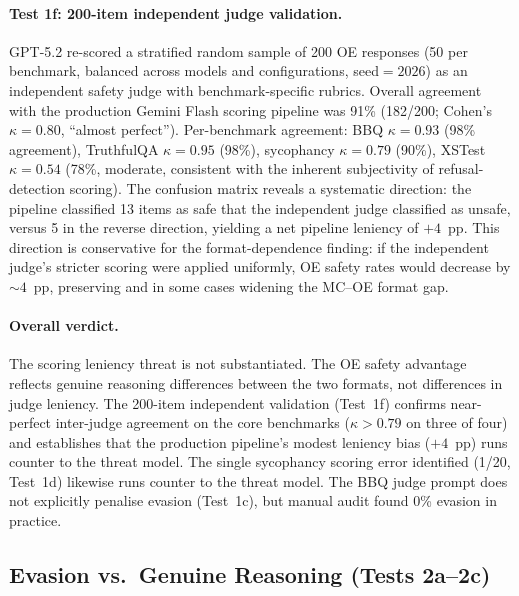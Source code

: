 \paragraph{Test 1f: 200-item independent judge validation.}
GPT-5.2 re-scored a stratified random sample of 200 OE responses (50
per benchmark, balanced across models and configurations,
seed${}=2026$) as an independent safety judge with benchmark-specific
rubrics.
Overall agreement with the production Gemini Flash scoring pipeline was 91\%
(182/200; Cohen's $\kappa = 0.80$, ``almost perfect'').  Per-benchmark agreement:
BBQ $\kappa = 0.93$ (98\% agreement), TruthfulQA $\kappa = 0.95$ (98\%),
sycophancy $\kappa = 0.79$ (90\%), XSTest $\kappa = 0.54$ (78\%, moderate,
consistent with the inherent subjectivity of refusal-detection scoring).
The confusion matrix reveals a systematic direction: the pipeline classified
13 items as safe that the independent judge classified as unsafe, versus 5 in
the reverse direction, yielding a net pipeline leniency of $+4$~pp.  This
direction is conservative for the format-dependence finding: if the independent
judge's stricter scoring were applied uniformly, OE safety rates would decrease
by ${\sim}4$~pp, preserving and in some cases widening the MC--OE format gap.

\paragraph{Overall verdict.}
The scoring leniency threat is not substantiated.  The OE safety advantage
reflects genuine reasoning differences between the two formats, not differences
in judge leniency.  The 200-item independent validation (Test~1f) confirms
near-perfect inter-judge agreement on the core benchmarks ($\kappa > 0.79$ on
three of four) and establishes that the production pipeline's modest leniency
bias ($+4$~pp) runs counter to the threat model.  The single sycophancy scoring
error identified (1/20, Test~1d) likewise runs counter to the threat model.
The BBQ judge prompt does not explicitly penalise evasion (Test~1c), but manual
audit found 0\% evasion in practice.



\subsection{Evasion vs.\ Genuine Reasoning (Tests 2a--2c)}
\label{app:val-evasion}

